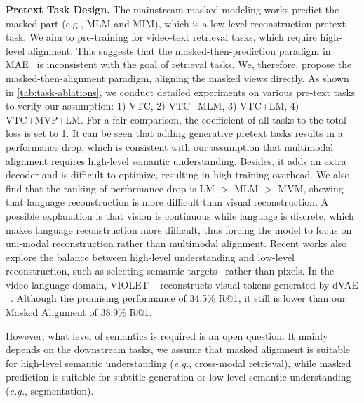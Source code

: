 \documentclass[10pt,twocolumn,letterpaper]{article}
\begin{document}
\vspace{1mm}\noindent\textbf{Pretext Task Design.} The mainstream masked modeling works predict the masked part (e.g., MLM and MIM), which is a low-level reconstruction pretext task. We aim to pre-training for video-text retrieval tasks, which require high-level alignment. This suggests that the masked-then-prediction paradigm in MAE~\cite{mae} is inconsistent with the goal of retrieval tasks. We, therefore, propose the masked-then-alignment paradigm, aligning the masked views directly. As shown in \cref{tab:task-ablations}, we conduct detailed experiments on various pre-text tasks to verify our assumption: 1) VTC, 2) VTC+MLM, 3) VTC+LM, 4) VTC+MVP+LM. For a fair comparison, the coefficient of all tasks to the total loss is set to 1. It can be seen that adding generative pretext tasks results in a performance drop, which is consistent with our assumption that multimodal alignment requires high-level semantic understanding. Besides, it adds an extra decoder and is difficult to optimize, resulting in high training overhead. We also find that the ranking of performance drop is LM $>$ MLM $>$ MVM, showing that language reconstruction is more difficult than visual reconstruction. A possible explanation is that vision is continuous while language is discrete, which makes language reconstruction more difficult, thus forcing the model to focus on uni-modal reconstruction rather than multimodal alignment. Recent works also explore the balance between high-level  understanding and low-level reconstruction, such as selecting  semantic targets~\cite{beit, maskft} rather than pixels. In the video-language domain, VIOLET ~\cite{VIOLET} reconstructs  visual tokens generated by dVAE ~\cite{dvae}. Although the promising performance of 34.5\% R@1, it still is lower than our Masked Alignment of 38.9\% R@1.

However, what level of semantics is required is an open question. It mainly depends on the downstream tasks, we assume that masked alignment is suitable for high-level semantic understanding (\emph{e.g.}, cross-modal retrieval), while masked prediction is suitable for subtitle generation or low-level semantic understanding (\emph{e.g.}, segmentation).
\end{document}
